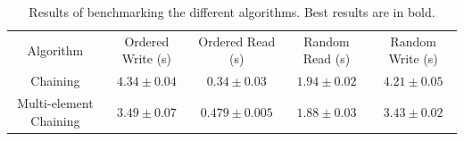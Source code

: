 \documentclass[12pt]{article}
\begin{document}
\begin{table}
    \begin{tabular}{ccccc} \toprule
        Algorithm & Ordered Write (s) & Ordered Read (s) & Random Read (s) & Random Write (s) \\
        Chaining & $4.34 \pm 0.04$ & $\mathbf{0.34 \pm 0.03}$ & $1.94 \pm 0.02$ & $4.21 \pm 0.05$ \\
        Multi-element Chaining & $\mathbf{3.49 \pm 0.07}$ & $0.479 \pm 0.005$ & $\mathbf{1.88 \pm 0.03}$ & $\mathbf{3.43 \pm 0.02}$ \\
        \bottomrule
    \end{tabular}
    \caption{Results of benchmarking the different algorithms. Best results are in bold.}
    \label{tab:perf}
\end{table}
\end{document}
